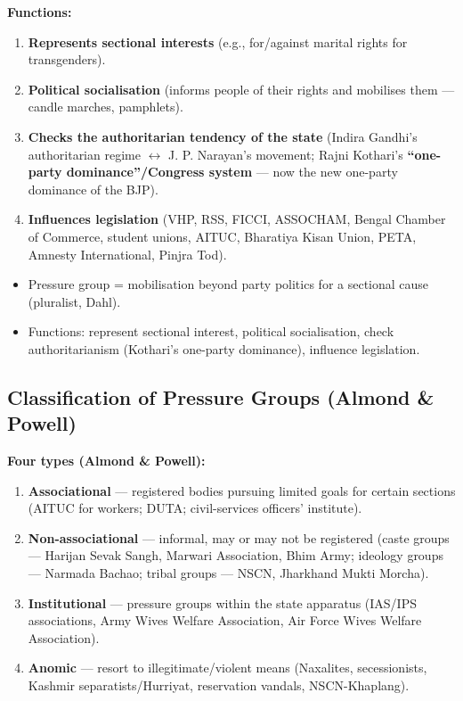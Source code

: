 \begin{DataFact}
\textbf{Functions:}
\begin{enumerate}
\item \textbf{Represents sectional interests} (e.g., for/against marital rights for transgenders).
\item \textbf{Political socialisation} (informs people of their rights and mobilises them --- candle marches, pamphlets).
\item \textbf{Checks the authoritarian tendency of the state} (Indira Gandhi's authoritarian regime $\leftrightarrow$ J. P. Narayan's movement; Rajni Kothari's \textbf{``one-party dominance''/Congress system} --- now the new one-party dominance of the BJP).
\item \textbf{Influences legislation} (VHP, RSS, FICCI, ASSOCHAM, Bengal Chamber of Commerce, student unions, AITUC, Bharatiya Kisan Union, PETA, Amnesty International, Pinjra Tod).
\end{enumerate}
\end{DataFact}

\begin{QuickRevision}
\begin{itemize}
\item Pressure group = mobilisation beyond party politics for a sectional cause (pluralist, Dahl).
\item Functions: represent sectional interest, political socialisation, check authoritarianism (Kothari's one-party dominance), influence legislation.
\end{itemize}
\end{QuickRevision}

\sectiondivider

\subsection{Classification of Pressure Groups (Almond \& Powell)}

\begin{DataFact}
\textbf{Four types (Almond \& Powell):}
\begin{enumerate}
\item \textbf{Associational} --- registered bodies pursuing limited goals for certain sections (AITUC for workers; DUTA; civil-services officers' institute).
\item \textbf{Non-associational} --- informal, may or may not be registered (caste groups --- Harijan Sevak Sangh, Marwari Association, Bhim Army; ideology groups --- Narmada Bachao; tribal groups --- NSCN, Jharkhand Mukti Morcha).
\item \textbf{Institutional} --- pressure groups within the state apparatus (IAS/IPS associations, Army Wives Welfare Association, Air Force Wives Welfare Association).
\item \textbf{Anomic} --- resort to illegitimate/violent means (Naxalites, secessionists, Kashmir separatists/Hurriyat, reservation vandals, NSCN-Khaplang).
\end{enumerate}
\end{DataFact}

